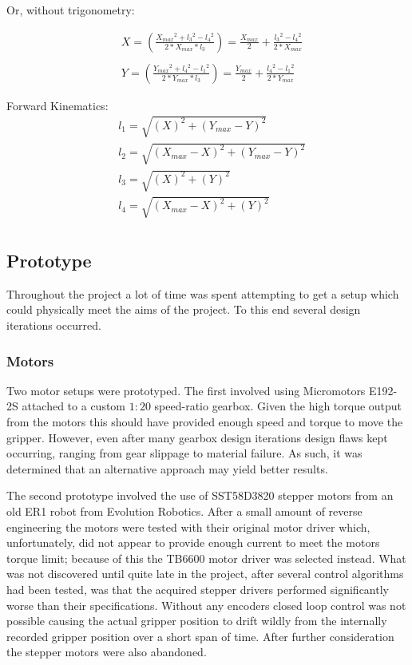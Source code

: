 \documentclass[conference]{IEEEtran}
\begin{document}
Or, without trigonometry:

\begin{equation} \label{inverse_kinematics_1}
\begin{aligned}
&X = \left(\frac{X_{max}{}^2 + l_3{}^2 - l_4{}^2}{2*X_{max}*l_3}\right) = \frac{X_{max}}{2} + \frac{l_3{}^2 - l_4{}^2}{2*X_{max}}\\ \\
&Y = \left(\frac{Y_{max}{}^2 + l_4{}^2 - l_1{}^2}{2*Y_{max}*l_3}\right) = \frac{Y_{max}}{2} + \frac{l_4{}^2 - l_1{}^2}{2*Y_{max}}
\end{aligned}
\end{equation}

Forward Kinematics:
\begin{equation} \label{forward_kinematics_1}
\begin{aligned}
&l_1 = \sqrt{\left(X\right)^2 + \left(Y_{max}-Y\right)^2}\\
&l_2 = \sqrt{\left(X_{max}-X\right)^2 + \left(Y_{max}-Y\right)^2}\\
&l_3 = \sqrt{\left(X\right)^2 + \left(Y\right)^2}\\
&l_4 = \sqrt{\left(X_{max}-X\right)^2 + \left(Y\right)^2}\\
\end{aligned}
\end{equation}
\subsection{Prototype}
Throughout the project a lot of time was spent attempting to get a setup which could physically meet the aims of the project. To this end several design iterations occurred.

\subsubsection{Motors}
Two motor setups were prototyped. The first involved using Micromotors E192-2S attached to a custom $1:20$ speed-ratio gearbox. Given the high torque output from the motors this should have provided enough speed and torque to move the gripper. However, even after many gearbox design iterations design flaws kept occurring, ranging from gear slippage to material failure. As such, it was determined that an alternative approach may yield better results.

The second prototype involved the use of SST58D3820 stepper motors from an old ER1 robot from Evolution Robotics. After a small amount of reverse engineering the motors were tested with their original motor driver which, unfortunately, did not appear to provide enough current to meet the motors torque limit; because of this the TB6600 motor driver was selected instead. What was not discovered until quite late in the project, after several control algorithms had been tested, was that the acquired stepper drivers performed significantly worse than their specifications. Without any encoders closed loop control was not possible causing the actual gripper position to drift wildly from the internally recorded gripper position over a short span of time. After further consideration the stepper motors were also abandoned.
\end{document}
